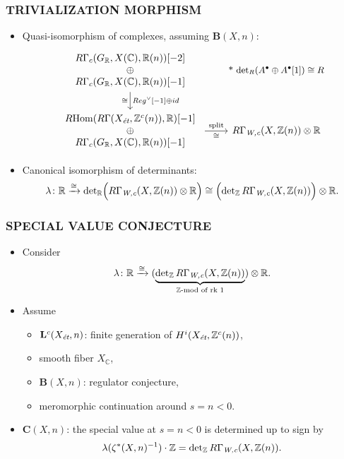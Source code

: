 \documentclass[handout]{beamer}
\newcommand{\CC}{\mathbb{C}}
\newcommand{\RR}{\mathbb{R}}
\newcommand{\ZZ}{\mathbb{Z}}
\DeclareMathOperator{\Hom}{Hom}
\newcommand{\et}{\text{\it ét}}
\newcommand{\Wc}{\text{\it W,c}}
\newcommand{\RHom}{R\!\Hom}
\begin{document}
\begin{frame}
  \frametitle{TRIVIALIZATION MORPHISM}

  \begin{itemize}
  \item<2-> Quasi-isomorphism of complexes, assuming $\mathbf{B} (X,n)$:
    \[ \begin{tikzcd}[column sep=4em,ampersand replacement=\&]
        \begin{array}{c} R\Gamma_c (G_\RR, X (\CC), \RR (n)) [-2] \\ \oplus \\ R\Gamma_c (G_\RR, X (\CC), \RR (n)) [-1] \end{array} \ar{d}{Reg^\vee [-1] \oplus id}[swap]{\cong} \&[-2em] \text{\small * $\det\nolimits_R (A^\bullet \oplus A^\bullet [1]) \cong R$} \\
        \begin{array}{c} \RHom (R\Gamma (X_\et, \ZZ^c (n)), \RR) [-1] \\ \oplus \\ R\Gamma_c (G_\RR, X (\CC), \RR (n)) [-1] \end{array} \ar{r}{\text{split}}[swap]{\cong} \& R\Gamma_\Wc (X, \ZZ (n)) \otimes \RR
      \end{tikzcd} \]

  \item<3-> Canonical isomorphism of determinants:
    \[ \lambda\colon \RR \xrightarrow{\cong}
      \det\nolimits_\RR \Bigl(R\Gamma_\Wc (X, \ZZ (n)) \otimes \RR\Bigr) \cong
      \Bigl(\det\nolimits_\ZZ R\Gamma_\Wc (X, \ZZ (n))\Bigr) \otimes \RR. \]
  \end{itemize}
\end{frame}


\begin{frame}
  \frametitle{SPECIAL VALUE CONJECTURE}

  \begin{itemize}
  \item<2-> Consider
  \[ \lambda\colon \RR \xrightarrow{\cong}
    (\underbrace{\det\nolimits_\ZZ R\Gamma_\Wc (X, \ZZ (n))}_{\ZZ\text{-mod of rk }1}) \otimes \RR. \]

  \item<3-> Assume
    \begin{itemize}
    \item $\mathbf{L}^c (X_\et, n)$: finite generation of $H^i (X_\et, \ZZ^c(n))$,
    \item smooth fiber $X_\CC$,
    \item $\mathbf{B} (X,n)$: regulator conjecture,
    \item meromorphic continuation around $s = n < 0$.
    \end{itemize}

  \item<4-> $\mathbf{C} (X,n)$: the special value at $s = n < 0$ is determined up to
    sign by
    \[ \lambda (\zeta^* (X,n)^{-1})\cdot \ZZ =
      \det\nolimits_\ZZ R\Gamma_\Wc (X, \ZZ (n)). \]
  \end{itemize}
\end{frame}
\end{document}
